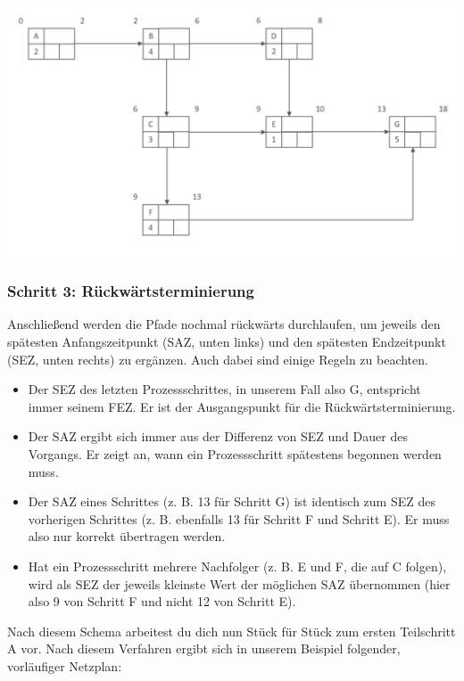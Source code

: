 \begin{center}
	\includegraphics[width=\textwidth]{Bilder/Netzplan/Netzplan2.png}
\end{center}

\subsubsection{Schritt 3: Rückwärtsterminierung}

Anschließend werden die Pfade nochmal rückwärts durchlaufen, um jeweils den spätesten Anfangszeitpunkt (SAZ, unten links) und den spätesten Endzeitpunkt (SEZ, unten rechts) zu ergänzen. Auch dabei sind einige Regeln zu beachten.

\begin{itemize}
	\item Der SEZ des letzten Prozessschrittes, in unserem Fall also G, entspricht immer seinem FEZ. Er ist der Ausgangspunkt für die Rückwärtsterminierung.
	\item Der SAZ ergibt sich immer aus der Differenz von SEZ und Dauer des Vorgangs. Er zeigt an, wann ein Prozessschritt spätestens begonnen werden muss.
	\item Der SAZ eines Schrittes (z. B. 13 für Schritt G) ist identisch zum SEZ des vorherigen Schrittes (z. B. ebenfalls 13 für Schritt F und Schritt E). Er muss also nur korrekt übertragen werden.
	\item Hat ein Prozessschritt mehrere Nachfolger (z. B. E und F, die auf C folgen), wird als SEZ der jeweils kleinste Wert der möglichen SAZ übernommen (hier also 9 von Schritt F und nicht 12 von Schritt E).
\end{itemize}

Nach diesem Schema arbeitest du dich nun Stück für Stück zum ersten Teilschritt A vor.
Nach diesem Verfahren ergibt sich in unserem Beispiel folgender, vorläufiger Netzplan:


